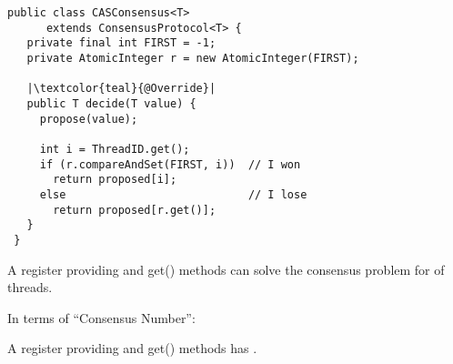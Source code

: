 \begin{frame}[fragile]{}
  \begin{lstlisting}[style = JavaStyle]
 public class CASConsensus<T> 
      extends ConsensusProtocol<T> {
   private final int FIRST = -1;
   private AtomicInteger r = new AtomicInteger(FIRST);

   |\textcolor{teal}{@Override}|
   public T decide(T value) {
     propose(value);

     int i = ThreadID.get();
     if (r.compareAndSet(FIRST, i))  // I won
       return proposed[i];
     else                            // I lose
       return proposed[r.get()];
   }
 }
  \end{lstlisting}
\end{frame}

\begin{frame}{}
  \begin{theorem}
    A register providing  and \textsf{get()} methods
    can solve the consensus problem for  of threads.
  \end{theorem}

  \pause
  \vspace{0.80cm}
  \centerline{In terms of ``Consensus Number'':}

  \vspace{0.60cm}
  \begin{theorem}
    A register providing  and \textsf{get()} methods
    has  .
  \end{theorem}
\end{frame}

